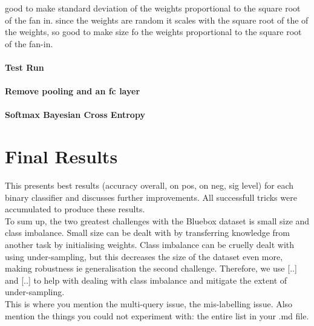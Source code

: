 \documentclass[a4paper,11pt]{article}
\begin{document}
good to make standard deviation of the weights proportional to the square root of the fan in. 
since the weights are random it scales with the square root of the of the weights, so good to make size fo the weights proportional to the square root of the fan-in. 

\paragraph{Test Run}


     
     
\paragraph{Remove pooling and an fc layer}

\paragraph{Softmax Bayesian Cross Entropy}



\section{Final Results}

This presents best results (accuracy overall, on pos, on neg, sig level) for each binary classifier and discusses further improvements. All successfull tricks were accumulated to produce these results. \\

To sum up, the two greatest challenges with the Bluebox dataset is small size and class imbalance. Small size can be dealt with by transferring knowledge from another task by initialising weights. Class imbalance can be cruelly dealt with using under-sampling, but this decreases the size of the dataset even more, making robustness ie generalisation the second challenge. Therefore, we use [..] and [..] to help with dealing with class imbalance and mitigate the extent of under-sampling. \\

This is where you mention the multi-query issue, the mis-labelling issue. Also mention the things you could not experiment with: the entire list in your .md file. \\
\end{document}
